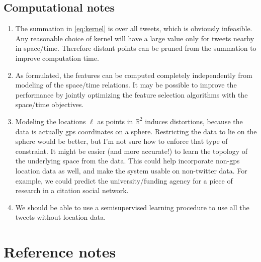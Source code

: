 \documentclass{article}
\newcommand{\R}{\mathbb{R}}
\begin{document}

\subsection{Computational notes}

\begin{enumerate}
    \item
        The summation in \eqref{eq:kernel} is over all tweets,
        which is obviously infeasible.
        Any reasonable choice of kernel will have a large value only for tweets nearby in space/time.
        Therefore distant points can be pruned from the summation to improve computation time.

    \item
        As formulated, the features can be computed completely independently from modeling of the space/time relations.
        It may be possible to improve the performance by jointly optimizing the feature selection algorithms with the space/time objectives.

    \item
        Modeling the locations $\ell$ as points in $\R^2$ induces distortions,
        because the data is actually gps coordinates on a sphere.
        Restricting the data to lie on the sphere would be better,
        but I'm not sure how to enforce that type of constraint.
        It might be easier (and more accurate!) to learn the topology of the underlying space from the data.
        This could help incorporate non-gps location data as well,
        and make the system usable on non-twitter data.
        For example, we could predict the university/funding agency for a piece of research in a citation social network.

    \item
        We should be able to use a semisupervised learning procedure to use all the tweets without location data.

\end{enumerate}




\section{Reference notes}

\end{document}
